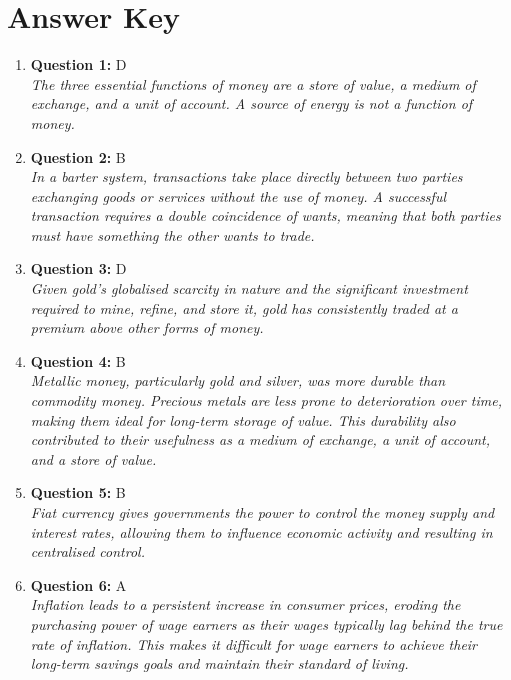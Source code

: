\documentclass[12pt,a4paper]{article}
\begin{document}
\bigskip


\newpage
\section*{Answer Key}

\begin{enumerate}
\item \textbf{Question 1:} D
\\ \textit{The three essential functions of money are a store of value, a medium of exchange, 
and a unit of account. A source of energy is not a function of money.}

\item \textbf{Question 2:} B
\\ \textit{In a barter system, transactions take place directly between two parties exchanging goods or 
services without the use of money. A successful transaction requires a double coincidence of 
wants, meaning that both parties must have something the other wants to trade.}

\item \textbf{Question 3:} D
\\ \textit{Given gold's globalised scarcity in nature and the significant investment required 
to mine, refine, and store it, gold has consistently traded at a premium above
other forms of money.}

\item \textbf{Question 4:} B
\\ \textit{Metallic money, particularly gold and silver, was more durable than commodity money. 
Precious metals are less prone to deterioration over time, making them ideal for
long-term storage of value. This durability also contributed to their usefulness as
a medium of exchange, a unit of account, and a store of value.}

\item \textbf{Question 5:} B
\\ \textit{Fiat currency gives governments the power to control the money supply and
interest rates, allowing them to influence economic activity and resulting
in centralised control.}

\item \textbf{Question 6:} A
\\ \textit{Inflation leads to a persistent increase in consumer prices, eroding the purchasing 
power of wage earners as their wages typically lag behind the true rate of inflation.
This makes it difficult for wage earners to achieve their long-term savings goals
and maintain their standard of living.}


\end{enumerate}
\end{document}
